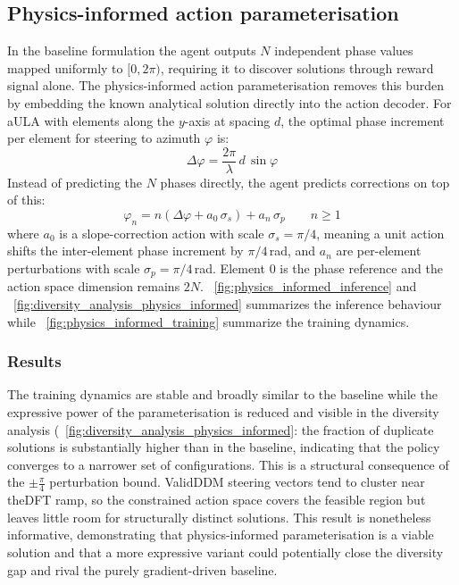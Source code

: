 \subsection{Physics-informed action parameterisation}

\label{subsec:physics_informed}

In the baseline formulation the agent outputs $N$ independent phase values mapped uniformly to $[0, 2\pi)$, requiring it to discover solutions through reward signal alone. The physics-informed action parameterisation removes this burden by embedding the known analytical solution directly into the action decoder. For a\gls{ULA} with elements along the $y$-axis at spacing $d$, the optimal phase increment per element for steering to azimuth $\varphi$ is:
\begin{equation}
    \Delta\varphi = \frac{2\pi}{\lambda}\,d\,\sin\varphi
\end{equation}
Instead of predicting the $N$ phases directly, the agent predicts corrections on top of this:
\begin{equation}
    \varphi_n = n\!\left(\Delta\varphi + a_0\,\sigma_s\right) + a_n\,\sigma_p \qquad n \geq 1
\end{equation}
where $a_0$ is a slope-correction action with scale $\sigma_s = \pi/4$, meaning a unit action shifts the inter-element phase increment by $\pi/4$\,rad, and $a_n$ are per-element perturbations with scale $\sigma_p = \pi/4$\,rad. Element $0$ is the phase reference and the action space dimension remains $2N$.
\figurename~\ref{fig:physics_informed_inference} and \figurename~\ref{fig:diversity_analysis_physics_informed} summarizes the inference behaviour while \figurename~\ref{fig:physics_informed_training} summarize the training dynamics.

\subsubsection{Results}
The training dynamics are stable and broadly similar to the baseline while the expressive power of the parameterisation is reduced and visible in the diversity analysis (\figurename~\ref{fig:diversity_analysis_physics_informed}: the fraction of duplicate solutions is substantially higher than in the baseline, indicating that the policy converges to a narrower set of configurations. This is a structural consequence of the $\pm\frac{\pi}{4}$ perturbation bound. Valid\gls{DDM} steering vectors tend to cluster near the\gls{DFT} ramp, so the constrained action space covers the feasible region but leaves little room for structurally distinct solutions. This result is nonetheless informative, demonstrating that physics-informed parameterisation is a viable solution and that a more expressive variant could potentially close the diversity gap and rival the purely gradient-driven baseline.

